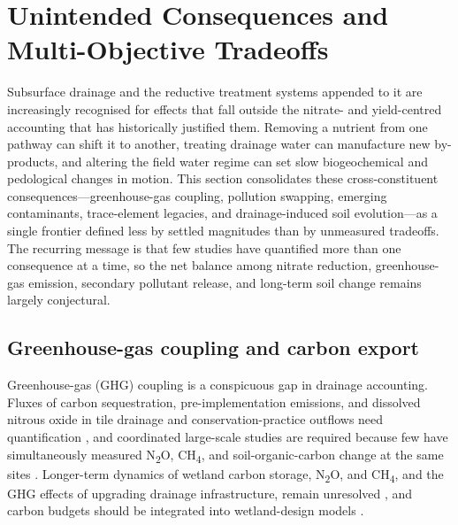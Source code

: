 \documentclass[11pt]{article}
\begin{document}
\section*{Unintended Consequences and Multi-Objective Tradeoffs}

Subsurface drainage and the reductive treatment systems appended to it are
increasingly recognised for effects that fall outside the nitrate- and
yield-centred accounting that has historically justified them. Removing a
nutrient from one pathway can shift it to another, treating drainage water can
manufacture new by-products, and altering the field water regime can set slow
biogeochemical and pedological changes in motion. This section consolidates
these cross-constituent consequences---greenhouse-gas coupling, pollution
swapping, emerging contaminants, trace-element legacies, and drainage-induced
soil evolution---as a single frontier defined less by settled magnitudes than
by unmeasured tradeoffs. The recurring message is that few studies have
quantified more than one consequence at a time, so the net balance among
nitrate reduction, greenhouse-gas emission, secondary pollutant release, and
long-term soil change remains largely conjectural.

\subsection{Greenhouse-gas coupling and carbon export}

Greenhouse-gas (GHG) coupling is a conspicuous gap in drainage accounting.
Fluxes of carbon sequestration, pre-implementation emissions, and dissolved
nitrous oxide in tile drainage and conservation-practice outflows need
quantification \parencite{Mitchell2023}, and coordinated large-scale studies
are required because few have simultaneously measured N\textsubscript{2}O,
CH\textsubscript{4}, and soil-organic-carbon change at the same sites
\parencite{Hall2025}. Longer-term dynamics of wetland carbon storage,
N\textsubscript{2}O, and CH\textsubscript{4}, and the GHG effects of upgrading
drainage infrastructure, remain unresolved \parencite{Mitchell2022}, and carbon
budgets should be integrated into wetland-design models \parencite{Kadlec2012}.
\end{document}
